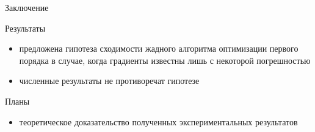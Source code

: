 \documentclass{beamer}
\begin{document}




\begin{frame}{Заключение}
     \begin{block}{Результаты}
     \begin{itemize}
         \item предложена гипотеза сходимости жадного алгоритма оптимизации первого порядка в случае, когда градиенты известны лишь с некоторой погрешностью
         \item численные результаты не противоречат гипотезе
     \end{itemize}
     \end{block}
     \begin{block}{Планы}
     \begin{itemize}
         \item теоретическое доказательство полученных экспериментальных результатов
     \end{itemize}
     \end{block}
 \end{frame}
\end{document}
